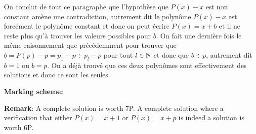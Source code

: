 On conclut de tout ce paragraphe que l'hypothèse que $P(x)- x$ est non constant amène une contradiction, autrement dit le polynôme $P(x) - x$ est forcément le polynôme constant et donc on peut écrire $P(x) = x + b$ et il ne reste plus qu'à trouver les valeurs possibles pour $b$. On fait une dernière fois le même raisonnement que précédemment pour trouver que $b = P(p) - p = p_1 -p \div p_l - p$ pour tout $l \in \mathbb{N}$ et donc que $b \div p$, autrement dit $b = 1$ ou $b = p$. On a déjà trouvé que ces deux polynômes sont effectivement des solutions et donc ce sont les seules.


\newpage
\textbf{Marking scheme:}

\textbf{Remark}: A complete solution is worth 7P. A complete solution where a verification that either $P(x)=x+1$ or $P(x)=x+p$ is indeed a solution is worth 6P.

